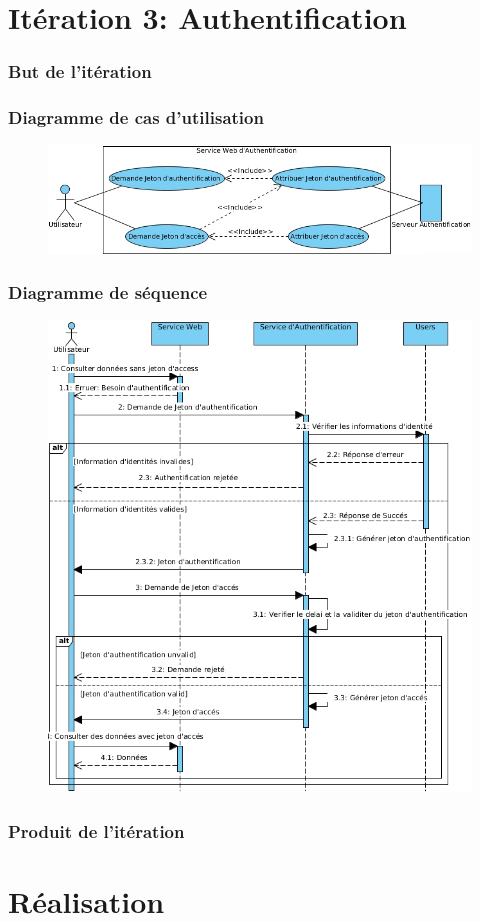 \documentclass{beamer}
\begin{document}
\section{Itération 3: Authentification}
\begin{frame}
    \frametitle{But de l'itération}
\end{frame}
\begin{frame}
    \frametitle{Diagramme de cas d'utilisation}
    \begin{figure}
        \includegraphics[width=\textwidth]{./diagrams/sprint3-webservices-oauth-usecase}
    \end{figure}
\end{frame}
\begin{frame}
    \frametitle{Diagramme de séquence}
    \begin{figure}
        \includegraphics[width=.65\textwidth]{./diagrams/sprint3-webservices-oauth-sequence}
    \end{figure}
\end{frame}
\begin{frame}
    \frametitle{Produit de l'itération}
\end{frame}

\section{Réalisation}
\end{document}

